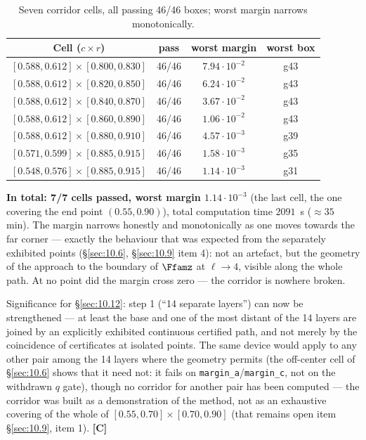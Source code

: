 \begin{table}[h]
\centering
\caption{Seven corridor cells, all passing 46/46 boxes; worst margin narrows monotonically.}
\label{tab:10.13-corridor}
\begin{tabular}{cccc}
\toprule
Cell ($c\times r$) & pass & worst margin & worst box \\
\midrule
$[0.588,0.612]\times[0.800,0.830]$ & 46/46 & $7.94\cdot 10^{-2}$ & g43 \\
$[0.588,0.612]\times[0.820,0.850]$ & 46/46 & $6.24\cdot 10^{-2}$ & g43 \\
$[0.588,0.612]\times[0.840,0.870]$ & 46/46 & $3.67\cdot 10^{-2}$ & g43 \\
$[0.588,0.612]\times[0.860,0.890]$ & 46/46 & $1.06\cdot 10^{-2}$ & g43 \\
$[0.588,0.612]\times[0.880,0.910]$ & 46/46 & $4.57\cdot 10^{-3}$ & g39 \\
$[0.571,0.599]\times[0.885,0.915]$ & 46/46 & $1.58\cdot 10^{-3}$ & g35 \\
$[0.548,0.576]\times[0.885,0.915]$ & 46/46 & $1.14\cdot 10^{-3}$ & g31 \\
\bottomrule
\end{tabular}
\end{table}

\textbf{In total: 7/7 cells passed, worst margin $1.14\cdot 10^{-3}$} (the last cell, the
one covering the end point $(0.55,0.90)$), total computation time $2091$~s
($\approx 35$ min). The margin narrows honestly and monotonically as one moves towards
the far corner --- exactly the behaviour that was expected from the separately
exhibited points (\S\ref{sec:10.6}, \S\ref{sec:10.9} item 4): not an artefact, but the geometry of the
approach to the boundary of $\Ffamz$ at $\ell \to 4$, visible along the whole path. At no
point did the margin cross zero --- the corridor is nowhere broken.

Significance for \S\ref{sec:10.12}: step 1 (``14 separate layers'') can now be
strengthened --- at least the base and one of the most distant of the 14 layers are
joined by an explicitly exhibited continuous certified path, and not merely by
the coincidence of certificates at isolated points. The same device would apply
to any other pair among the 14 layers where the geometry permits (the
off-center cell of \S\ref{sec:10.6} shows that it need not: it fails on
\texttt{margin\_a}/\texttt{margin\_c}, not on the withdrawn $q$ gate), though no corridor for another pair has
been computed --- the corridor was built as a demonstration
of the method, not as an exhaustive covering of the whole of
$[0.55,0.70]\times[0.70,0.90]$ (that remains open item \S\ref{sec:10.9}, item 1). \textbf{[C]}




